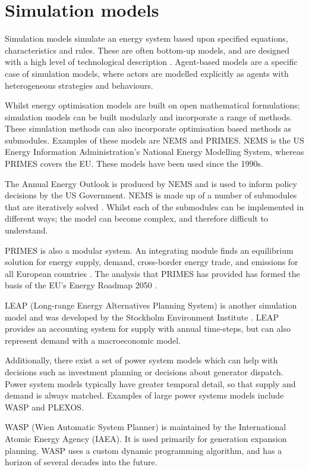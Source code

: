 \section{Simulation models}
\label{sec:litreview:simulation}

Simulation models simulate an energy system based upon specified equations, characteristics and rules. These are often bottom-up models, and are designed with a high level of technological description \cite{Ringkjob2018}. Agent-based models are a specific case of simulation models, where actors are modelled explicitly as agents with heterogeneous strategies and behaviours.

Whilst energy optimisation models are built on open mathematical formulations; simulation models can be built modularly and incorporate a range of methods. These simulation methods can also incorporate optimisation based methods as submodules. Examples of these models are NEMS and PRIMES. NEMS is the US Energy Information Administration's National Energy Modelling System, whereas PRIMES covers the EU. These models have been used since the 1990s.

The Annual Energy Outlook is produced by NEMS and is used to inform policy decisions by the US Government. NEMS is made up of a number of submodules that are iteratively solved \cite{Gabriel2001}. Whilst each of the submodules can be implemented in different ways; the model can become complex, and therefore difficult to understand. 

PRIMES is also a modular system. An integrating module finds an equilibrium solution for energy supply, demand, cross-border energy trade, and emissions for all European countries \cite{Capros2012}. The analysis that PRIMES has provided has formed the basis of the EU's Energy Roadmap 2050 \cite{Gupta2011}.

LEAP (Long-range Energy Alternatives Planning System) is another simulation model and was developed by the Stockholm Environment Institute \cite{LEAP2012a}. LEAP provides an accounting system for supply with annual time-steps, but can also represent demand with a macroeconomic model. 

Additionally, there exist a set of power system models which can help with decisions such as investment planning or decisions about generator dispatch. Power system models typically have greater temporal detail, so that supply and demand is always matched. Examples of large power systems models include WASP and PLEXOS.

WASP (Wien Automatic System Planner) is maintained by the International Atomic Energy Agency (IAEA). It is used primarily for generation expansion planning. WASP uses a custom dynamic programming algorithm, and has a horizon of several decades into the future. 


